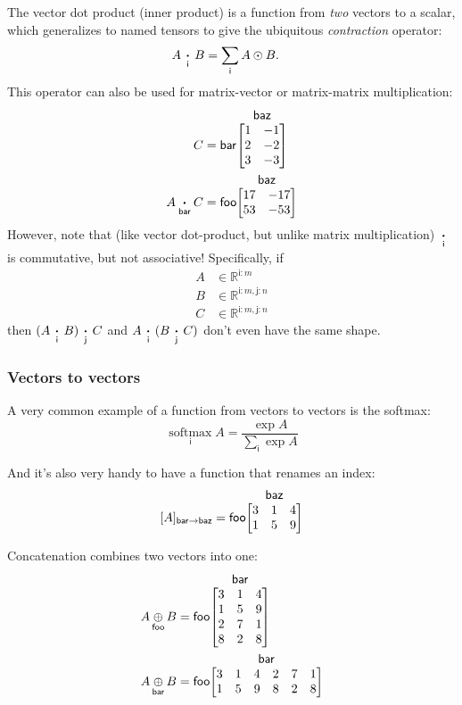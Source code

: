 \documentclass{article}
\makeatletter
\newcommand{\name}[1]{\mathsf{#1}}
\newcommand{\ndot}[1]{\mathbin{\mathop{\thinspace\boldsymbol\cdot\thinspace}\limits_{\name{#1}}}}
\newcommand{\nsum}[1]{\mathop{\sum}_{\name{#1}}}
\newcommand{\nconcat}[1]{\mathop{\oplus}_{\name{#1}}}
\newcommand{\nfun}[2]{\mathop{\text{#2}}\limits_{\name{#1}}}
\newcommand{\nmatrix}[3]{\name{#1}\begin{array}[b]{@{}c@{}}\name{#2}\\\begin{bmatrix}#3\end{bmatrix}\end{array}}
\makeatother
\begin{document}
The vector dot product (inner product) is a function from \emph{two} vectors to a scalar, which generalizes to named tensors to give the ubiquitous \emph{contraction} operator:
\begin{align*}
  A \ndot{i} B &= \nsum{i} A \odot B.
\end{align*}
This operator can also be used for matrix-vector or matrix-matrix multiplication:
\begin{align*}
C &= \nmatrix{bar}{baz}{
  1 & -1 \\ 2 & -2 \\ 3 & -3
} \\
A \ndot{bar} C &= \nmatrix{foo}{baz}{
  17 & -17 \\
  53 & -53
}
\end{align*}
However, note that (like vector dot-product, but unlike matrix multiplication) $\ndot{i}$ is commutative, but not associative! Specifically, if
\begin{align*}
A &\in \mathbb{R}^{\name{i}:m} \\
B &\in \mathbb{R}^{\name{i}:m,\name{j}:n} \\
C &\in \mathbb{R}^{\name{i}:m,\name{j}:n}
\end{align*}
then $(A \ndot{i} B) \ndot{j} C$ and $A \ndot{i} (B \ndot{j} C)$ don't even have the same shape.

\subsubsection{Vectors to vectors}

A very common example of a function from vectors to vectors is the softmax:
\begin{equation*}
  \nfun{i}{softmax} A = \frac{\exp A}{\nsum{i} \exp A}
\end{equation*}

And it's also very handy to have a function that renames an index:
\begin{equation*}
[A]_{\name{bar}\rightarrow\name{baz}} = \nmatrix{foo}{baz}{
  3 & 1 & 4 \\
  1 & 5 & 9
}
\end{equation*}

Concatenation combines two vectors into one:
\begin{align*}
  A \nconcat{foo} B &= \nmatrix{foo}{bar}{
    3 & 1 & 4 \\
    1 & 5 & 9 \\
    2 & 7 & 1 \\
    8 & 2 & 8
  } \\
  A \nconcat{bar} B &= \nmatrix{foo}{bar}{
    3 & 1 & 4 & 2 & 7 & 1 \\
    1 & 5 & 9 & 8 & 2 & 8
  }
\end{align*}
\end{document}
